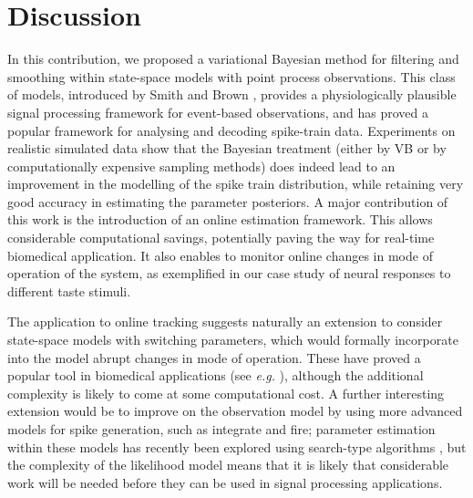 \documentclass{article}
\begin{document}
\section{Discussion}

In this contribution, we proposed a variational Bayesian method for filtering and smoothing within
state-space models with point process observations. This class of models, introduced by Smith and
Brown \cite{Smith_2003}, provides a physiologically plausible signal processing framework for
event-based observations, and has proved a popular framework for analysing and decoding spike-train
data. Experiments on realistic simulated data show that the Bayesian treatment (either by VB or by
computationally expensive sampling methods) does indeed lead to an improvement in the modelling of
the spike train distribution, while retaining very good accuracy in estimating the parameter
posteriors. A major contribution of this work is the introduction of an online estimation framework.
This allows considerable computational savings, potentially paving the way for real-time biomedical
application. It also enables to monitor online changes in mode of operation of the system, as
exemplified in our case study of neural responses to different taste stimuli.

The application to online tracking suggests naturally an extension to consider state-space models
with switching parameters, which would formally incorporate into the model abrupt changes in mode of
operation. These have proved a popular tool in biomedical applications (see {\em e.g.}
\cite{Quinn_2008}), although the additional complexity is likely to come at some computational cost.
A further interesting extension would be to improve on the observation model by using more advanced
models for spike generation, such as integrate and fire; parameter estimation within these models
has recently been explored using search-type algorithms \cite{MacGregor_2009}, but the complexity of the likelihood model means
that it is likely that considerable work will be needed before they can be used in signal processing
applications.
\end{document}
